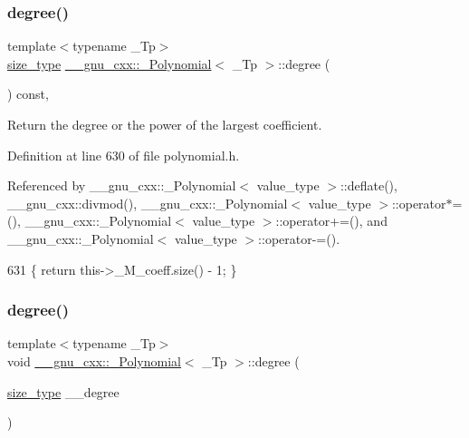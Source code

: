 \subsubsection{\texorpdfstring{degree()}{degree()}\hspace{0.1cm}{\footnotesize\ttfamily [1/2]}}
{\footnotesize\ttfamily template$<$typename \+\_\+\+Tp$>$ \\
\hyperlink{class____gnu__cxx_1_1__Polynomial_a8b25fcfd4acaad0c5c08b649c22da28a}{size\+\_\+type} \hyperlink{class____gnu__cxx_1_1__Polynomial}{\+\_\+\+\_\+gnu\+\_\+cxx\+::\+\_\+\+Polynomial}$<$ \+\_\+\+Tp $>$\+::degree (\begin{DoxyParamCaption}{ }\end{DoxyParamCaption}) const\hspace{0.3cm}{\ttfamily [inline]}, {\ttfamily [noexcept]}}

Return the degree or the power of the largest coefficient. 

Definition at line 630 of file polynomial.\+h.



Referenced by \+\_\+\+\_\+gnu\+\_\+cxx\+::\+\_\+\+Polynomial$<$ value\+\_\+type $>$\+::deflate(), \+\_\+\+\_\+gnu\+\_\+cxx\+::divmod(), \+\_\+\+\_\+gnu\+\_\+cxx\+::\+\_\+\+Polynomial$<$ value\+\_\+type $>$\+::operator$\ast$=(), \+\_\+\+\_\+gnu\+\_\+cxx\+::\+\_\+\+Polynomial$<$ value\+\_\+type $>$\+::operator+=(), and \+\_\+\+\_\+gnu\+\_\+cxx\+::\+\_\+\+Polynomial$<$ value\+\_\+type $>$\+::operator-\/=().


\begin{DoxyCode}
631       \{ \textcolor{keywordflow}{return} this->\_M\_coeff.size() - 1; \}
\end{DoxyCode}
\mbox{\label{class____gnu__cxx_1_1__Polynomial_af6ae7990b6185dc3597a8a5d6abdd13a}} 
\subsubsection{\texorpdfstring{degree()}{degree()}\hspace{0.1cm}{\footnotesize\ttfamily [2/2]}}
{\footnotesize\ttfamily template$<$typename \+\_\+\+Tp$>$ \\
void \hyperlink{class____gnu__cxx_1_1__Polynomial}{\+\_\+\+\_\+gnu\+\_\+cxx\+::\+\_\+\+Polynomial}$<$ \+\_\+\+Tp $>$\+::degree (\begin{DoxyParamCaption}\item[{\hyperlink{class____gnu__cxx_1_1__Polynomial_a8b25fcfd4acaad0c5c08b649c22da28a}{size\+\_\+type}}]{\+\_\+\+\_\+degree }\end{DoxyParamCaption})\hspace{0.3cm}{\ttfamily [inline]}}

